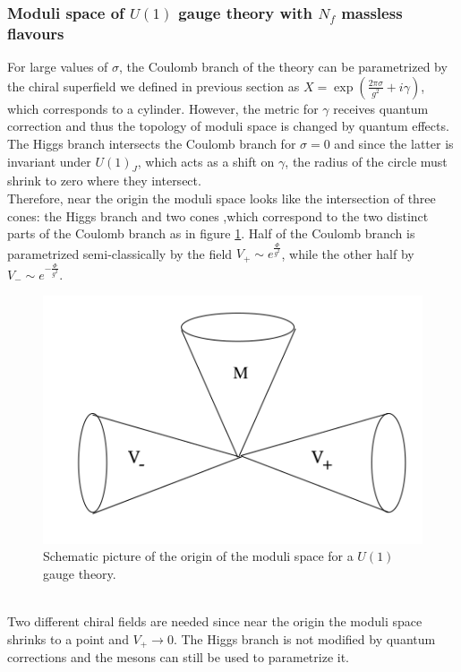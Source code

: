 \subsubsection{Moduli space of $U(1)$ gauge theory with $N_f$ massless flavours }
For large values of $\sigma$, the Coulomb branch of the theory can be parametrized by the chiral superfield we defined in previous section as $X = \exp{ \left( \frac{ 2 \pi \sigma}{g^2} + i \gamma  \right) } $, which corresponds to a cylinder.
However, the metric for $\gamma$ receives quantum correction and thus the topology of moduli space is changed by quantum effects.\\
The Higgs branch intersects the Coulomb branch for $\sigma=0$ and since the latter is invariant under $U(1)_J$, which acts as a shift on $\gamma$, the radius of the circle must shrink to zero where they intersect.
\\
Therefore, near the origin the moduli space looks like the intersection of three cones: the Higgs branch and two cones ,which correspond to the two distinct parts of the Coulomb branch as in figure \ref{fig:u1_origin_cones}.
Half of the Coulomb branch is parametrized semi-classically by the field $V_+ \sim e^{\frac{\Phi}{g^2}}$, while the other half by $V_- \sim e^{ -\frac{\Phi}{g^2} }$. 
\begin{figure}[ht]
\centering
\includegraphics[scale=0.38]{u1_threecones.png}
\caption{Schematic picture of the origin of the moduli space for a $U(1)$ gauge theory.}
\label{fig:u1_origin_cones}
\end{figure}	
\\
Two different chiral fields are needed since near the origin the moduli space shrinks to a point and $V_+ \rightarrow 0$. 
The Higgs branch is not modified by quantum corrections and the mesons can still be used to parametrize it.\\
